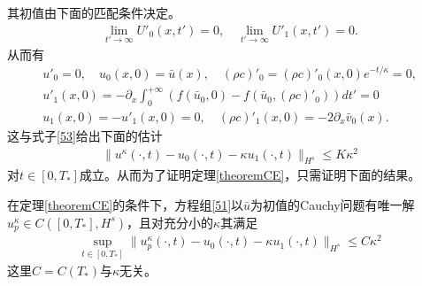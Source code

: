 其初值由下面的匹配条件决定。
\begin{eqnarray*}
  \lim_{t' \to \infty} U'_0(x,t') = 0 , \quad \lim_{t' \to \infty} U'_1(x,t') = 0 .
\end{eqnarray*}
从而有
\begin{eqnarray*}
 u'_0 =0, \quad u_0(x,0) = \bar{u}(x), \quad  (\rho c)'_0 = (\rho c)'_0(x,0)e^{-t/\kappa}=0 , \\[4mm]
 u'_1(x,0) = -\partial_x\int_0^{+\infty} (f(\bar u_0,0) - f(\bar u_0,(\rho c)'_0)) dt'=0\\
 u_1(x,0) =  - u'_1(x,0)=0, \quad (\rho c)'_1(x,0) = - 2\partial_x\bar v_0(x).
\end{eqnarray*}
这与式子\eqref{53}给出下面的估计
\begin{eqnarray*}
  \|u^\kappa(\cdot, t) - u_0 (\cdot, t) - \kappa u_1(\cdot, t) \|_{H^s} \le K \kappa^2
\end{eqnarray*}
对$t \in [0,T_*]$成立。从而为了证明定理\ref{theoremCE}，只需证明下面的结果。



\begin{lemma}\label{lemmaCE}
在定理\ref{theoremCE}的条件下，方程组\eqref{51}以$\bar{u}$为初值的Cauchy问题有唯一解$u_p^\kappa \in C([0,T_*],H^s)$，且对充分小的$\kappa$其满足
\begin{eqnarray}\label{eq:wcediff}
  \sup_{t \in [0,T_*]} \| u^\kappa_p(\cdot,t) - u_0 (\cdot, t) - \kappa u_1(\cdot, t)\|_{H^s} \le C \kappa^2
\end{eqnarray}
这里$C=C(T_*)$与$\kappa$无关。
\end{lemma}

